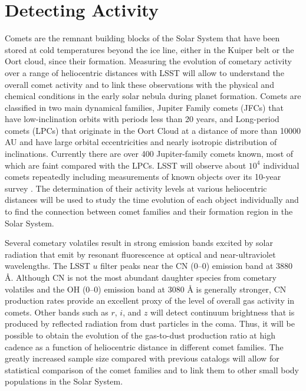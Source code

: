 \navigationbar


\section{Detecting Activity}
\def\secname{\chpname:activity}\label{sec:\secname}


Comets are the remnant building blocks of the Solar System
that have been stored at cold temperatures beyond the ice
line, either in the Kuiper belt or the Oort cloud, since their
formation.  Measuring the evolution of cometary activity over
a range of heliocentric distances with LSST will allow to
understand the overall comet activity and to link these
observations with the physical and chemical conditions in the
early solar nebula during planet formation.  Comets are
classified in two main dynamical families, Jupiter Family
comets (JFCs) that have low-inclination orbits with periods
less than 20 years, and Long-period comets (LPCs) that
originate in the Oort Cloud at a distance of more than 10000
AU and have large orbital eccentricities and nearly isotropic
distribution of inclinations.  Currently there are over 400
Jupiter-family comets known, most of which are faint compared
with the LPCs.  LSST will observe about $10^4$ individual
comets repeatedly including measurements of known objects over
its 10-year survey \citep{2010PhDT.......241S}. The
determination of their activity levels at various heliocentric
distances will be used to study the time evolution of each
object individually and to find the connection between comet
families and their formation region in the Solar System.

Several cometary volatiles result in strong emission bands
excited by solar radiation that emit by resonant fluorescence
at optical and near-ultraviolet wavelengths.  The LSST $u$
filter peaks near the CN (0--0) emission band at 3880 \r{A}.
Although CN is not the most abundant daughter species from
cometary volatiles and the OH (0--0) emission band at 3080
\r{A} is generally stronger, CN production rates provide an
excellent proxy of the level of overall gas activity in
comets. Other bands such as $r$, $i$, and $z$ will detect
continuum brightness that is produced by reflected radiation
from dust particles in the coma. Thus, it will be possible to
obtain the evolution of the gas-to-dust production ratio at
high cadence as a function of heliocentric distance in
different comet families. The greatly increased sample size
compared with previous catalogs \citep{1995Icar..118..223A}
will allow for statistical comparison of the comet families
and to link them to other small body populations in the Solar
System.

